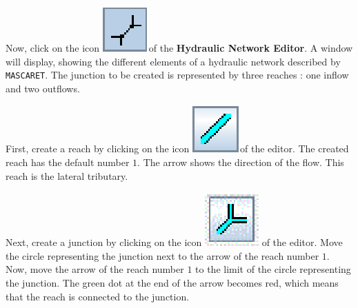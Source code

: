 \documentclass[a4paper,12pt]{article}
\begin{document}
Now, click on the icon \includegraphics[scale=0.6]{create_nw}of
the\textbf{ Hydraulic Network Editor}. A window will display, showing the
different elements of a hydraulic network described by \texttt{MASCARET}. The
junction to be created is represented by three reaches : one inflow
and two outflows.

\vspace{0.5cm}

First, create a reach by clicking on the icon \includegraphics[scale=0.6]{reach}of
the editor. The created reach has the default number $1$. The arrow shows the direction of the flow. This reach is
the lateral tributary. 

\vspace{0.5cm}

Next, create a junction by clicking on the icon \includegraphics[scale=0.6]{junction}
of the editor. Move the circle representing the junction next to the
arrow of the reach number $1$. Now, move the arrow of the reach number
$1$ to the limit of the circle representing the junction. The green
dot at the end of the arrow becomes red, which means that the reach
is connected to the junction. 
\end{document}
